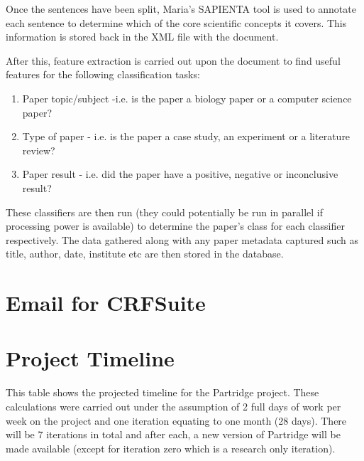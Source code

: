 Once the sentences have been split, Maria's SAPIENTA tool is used to annotate
each sentence to determine which of the core scientific concepts it covers.
This information is stored back in the XML file with the document.

After this, feature extraction is carried out upon the document to find useful
features for the following classification tasks:

\begin{enumerate}
\item Paper topic/subject -i.e. is the paper a biology paper or a computer science paper?
\item Type of paper - i.e. is the paper a case study, an experiment or a literature review?
\item Paper result - i.e. did the paper have a positive, negative or inconclusive result?
\end{enumerate}

These classifiers are then run (they could potentially be run in parallel if
processing power is available) to determine the paper's class for each
classifier respectively. The data gathered along with any paper metadata
captured such as title, author, date, institute etc are then stored in the
database.


\section{Email for CRFSuite}
\label{sec:crfemail}


\section{Project Timeline}
\label{sec:timeline}

This table shows the projected timeline for the Partridge project. These
calculations were carried out under the assumption of 2 full days of work per
week on the project and one iteration equating to one month (28 days). There
will be 7 iterations in total and after each, a new version of Partridge will
be made available (except for iteration zero which is a research only
iteration).


